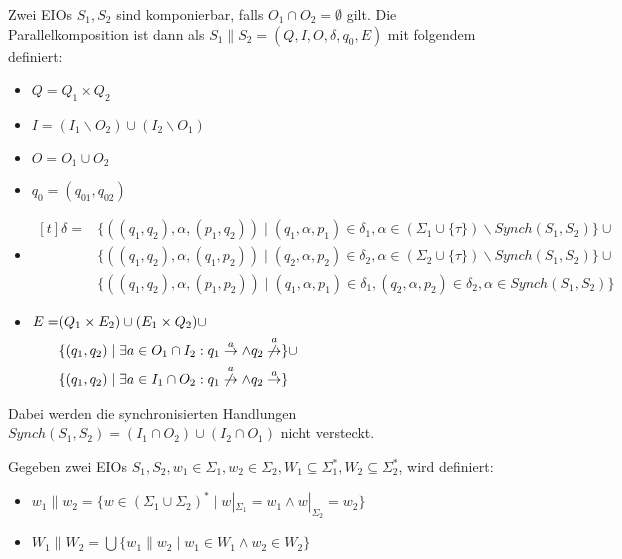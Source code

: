 \begin{Def}[Parallelkomposition]
  Zwei EIOs $S_1, S_2$ sind komponierbar, falls
  $O_1\cap O_2=\emptyset$ gilt. Die Parallelkomposition ist dann als
  $S_1\|S_2=(Q,I,O,\delta ,q_0,E)$ mit folgendem definiert:
  \begin{itemize}
    \item $Q=Q_1\times Q_2$
    \item $I=(I_1\backslash O_2)\cup(I_2\backslash O_1)$
    \item $O=O_1\cup O_2$
    \item $q_0=(q_{01},q_{02})$
    \item $\begin{aligned}[t]
    \delta =&\{((q_1,q_2),\alpha ,(p_1,q_2))\mid (q_1,\alpha ,p_1)\in\delta
      _1,\alpha\in(\Sigma _1\cup\{\tau\})\backslash Synch(S_1,S_2)\}\cup\\
      &\{((q_1,q_2),\alpha ,(q_1,p_2))\mid (q_2,\alpha ,p_2)\in\delta
      _2,\alpha\in(\Sigma _2\cup\{\tau\})\backslash Synch(S_1,S_2)\}\cup\\
      &\{((q_1,q_2),\alpha ,(p_1,p_2))\mid (q_1,\alpha ,p_1)\in\delta
      _1, (q_2,\alpha ,p_2)\in\delta _2, \alpha\in Synch(S_1,S_2)\}
  \end{aligned}$
    \item $\begin{aligned}[t]
    E=&(Q_1\times E_2)\cup (E_1\times Q_2)\cup\\
      &\{(q_1,q_2)\mid \exists a\in O_1\cap I_2: q_1\overset{a}{\rightarrow}\wedge
  q_2\overset{a}{\not{\hspace{-0.1cm}\rightarrow}}\}\cup\\
  &\{(q_1,q_2)\mid \exists a\in I_1\cap O_2:
q_1\overset{a}{\not{\hspace{-0.1cm}\rightarrow}}\wedge
q_2\overset{a}{\rightarrow}\}
  \end{aligned}$
  \end{itemize}
  Dabei werden die synchronisierten Handlungen $Synch(S_1,
  S_2)=(I_1\cap O_2)\cup(I_2\cap O_1)$ nicht versteckt.
\end{Def}

\begin{Def}
  Gegeben zwei EIOs $S_1, S_2,
  w_1\in\Sigma _1, w_2\in\Sigma _2, W_1\subseteq\Sigma _1^*, W_2\subseteq\Sigma
  _2^*$, wird definiert:
  \begin{itemize}
    \item $w_1\| w_2=\{w\in (\Sigma _1\cup\Sigma _2)^*\mid w|_{\Sigma _1}=w_1\wedge
      w|_{\Sigma _2}=w_2\}$
    \item $W_1\| W_2=\bigcup\{w_1\| w_2\mid w_1\in W_1\wedge w_2\in W_2\}$
  \end{itemize}
\end{Def}

